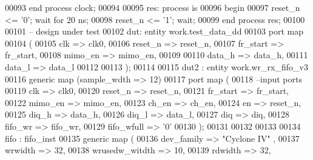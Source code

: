 \begin{DoxyCode}
00093     \textcolor{keywordflow}{end} \textcolor{keywordflow}{process} \textcolor{vhdlchar}{clock};
00094     
00095         res: \textcolor{keywordflow}{process} \textcolor{keywordflow}{is}
00096 \textcolor{vhdlkeyword}{    begin}
00097         \textcolor{vhdlchar}{reset_n} \textcolor{vhdlchar}{<=} \textcolor{vhdlchar}{'}\textcolor{vhdllogic}{}\textcolor{vhdllogic}{0}\textcolor{vhdlchar}{'}; \textcolor{keywordflow}{wait} \textcolor{keywordflow}{for} \textcolor{vhdllogic}{}\textcolor{vhdllogic}{20} \textcolor{vhdlchar}{ns};
00098         \textcolor{vhdlchar}{reset_n} \textcolor{vhdlchar}{<=} \textcolor{vhdlchar}{'}\textcolor{vhdllogic}{}\textcolor{vhdllogic}{1}\textcolor{vhdlchar}{'}; \textcolor{keywordflow}{wait};
00099     \textcolor{keywordflow}{end} \textcolor{keywordflow}{process} \textcolor{vhdlchar}{res};
00100     
00101 \textcolor{keyword}{          -- design under test  }
00102       dut: \textcolor{keywordflow}{entity} work.test_data_dd
00103       \textcolor{keywordflow}{port} \textcolor{keywordflow}{map} 
00104     (
00105         clk       => clk0, 
00106         reset_n   => reset_n,
00107             fr_start     => fr_start,
00108             mimo_en   => mimo_en,
00109           
00110             data_h        => data_h, 
00111             data_l        => data_l    
00112 
00113   \textcolor{vhdlchar}{)};
00114   
00115   dut2 : \textcolor{keywordflow}{entity} work.wr_rx_fifo_v3
00116     \textcolor{keywordflow}{generic} \textcolor{keywordflow}{map} (sample_wdth => \textcolor{vhdllogic}{12}\textcolor{vhdlchar}{)}
00117   \textcolor{keywordflow}{port} \textcolor{keywordflow}{map} (
00118 \textcolor{keyword}{        --input ports }
00119             clk              => clk0, 
00120             reset_n     => reset_n,
00121             fr_start         => fr_start,
00122             mimo_en       => mimo_en,
00123             ch_en              => ch_en, 
00124             en                 => reset_n,
00125             diq_h              => data_h, 
00126             diq_l              => data_l, 
00127             diq              => diq, 
00128             fifo_wr       => fifo_wr, 
00129             fifo_wfull  => '0'
00130         \textcolor{vhdlchar}{)};
00131         
00132         
00133         
00134  fifo :  fifo_inst 
00135   \textcolor{keywordflow}{generic} \textcolor{keywordflow}{map} (
00136             dev_family      => \textcolor{keyword}{"Cyclone IV"} , 
00137             wrwidth         => \textcolor{vhdllogic}{32}, 
00138             wrusedw_witdth  => \textcolor{vhdllogic}{10}, 
00139             rdwidth         => \textcolor{vhdllogic}{32}, 

\end{DoxyCode}
